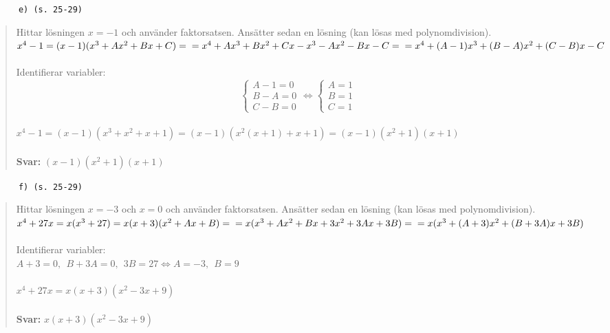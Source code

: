 \documentclass[a4paper]{article}
\newcommand{\tskcol}[1]{\textcolor{tskcol}{#1}}
\begin{document}
	\texttt{\tskcol{~~~~~~e) (s. 25-29)}}
	\begin{quotation}
		\noindent
		Hittar lösningen $x=-1$ och använder faktorsatsen. Ansätter sedan en lösning (kan lösas med polynomdivision). \\
		$x^4-1=(x-1)(x^3+Ax^2+Bx+C)= \\
		=x^4+Ax^3+Bx^2+Cx-x^3-Ax^2-Bx-C= \\
		=x^4+(A-1)x^3+(B-A)x^2+(C-B)x-C$ \\ \\
		Identifierar variabler: \\
		\[\begin{cases}
		A-1=0 \\
		B-A=0 \\
		C-B=0
		\end{cases}
		\Leftrightarrow
		\begin{cases}
		A=1 \\
		B=1 \\
		C=1
		\end{cases}\] \\
		$x^4-1=(x-1)(x^3+x^2+x+1)=(x-1)(x^2(x+1)+x+1)=(x-1)(x^2+1)(x+1)$
		\\ \\
		\textbf{Svar:} $(x-1)(x^2+1)(x+1)$
	\end{quotation}
	
	\texttt{\tskcol{~~~~~~f) (s. 25-29)}}
	\begin{quotation}
		\noindent
		Hittar lösningen $x=-3$ och $x=0$ och använder faktorsatsen. Ansätter sedan en lösning (kan lösas med polynomdivision). \\
		$x^4+27x=x(x^3+27)=x(x+3)(x^2+Ax+B)= \\
		=x(x^3+Ax^2+Bx+3x^2+3Ax+3B)= \\
		=x(x^3+(A+3)x^2+(B+3A)x+3B)$ \\ \\
		Identifierar variabler: \\
		$A+3=0,~~B+3A=0,~~3B=27 \Leftrightarrow A=-3,~~B=9$ \\ \\
		$x^4+27x=x(x+3)(x^2-3x+9)$
		\\ \\
		\textbf{Svar:} $x(x+3)(x^2-3x+9)$
	\end{quotation}
	
\end{document}
